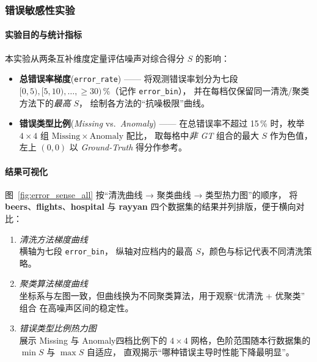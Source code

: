 \documentclass[10pt]{article} %
\numberwithin{equation}{section}
\begin{document}
\subsubsection{\textcolor[rgb]{0.00,0.07,1.00}{错误敏感性实验}}
\label{sec:error_sense_exp}

\paragraph{实验目的与统计指标}
本实验从两条互补维度定量评估噪声对综合得分 \(S\) 的影响：
\begin{itemize}[leftmargin=1.9em]
  \item \textbf{总错误率梯度}\;(\texttt{error\_rate}) ——  
        将观测错误率划分为七段
        \(\![0,5),[5,10),\dots,\ge{}30)\,\%\)（记作 \texttt{error\_bin}），
        并在每档仅保留同一清洗\;/\;聚类方法下的\emph{最高} \(S\)，
        绘制各方法的“抗噪极限”曲线。
  \item \textbf{错误类型比例}\;(\textit{Missing} vs.\ \textit{Anomaly}) ——  
        在总错误率不超过 15 \% 时，枚举
        \(4\times4\) 组 \(\mathrm{Missing}\times\mathrm{Anomaly}\) 配比，
        取每格中\emph{非 GT} 组合的最大 \(S\) 作为色值，
        左上 \((0,0)\) 以 \textit{Ground-Truth} 得分作参考。
\end{itemize}

\paragraph{结果可视化}
图~\ref{fig:error_sense_all} 按“清洗曲线 → 聚类曲线 → 类型热力图”的顺序，
将 \textbf{beers}、\textbf{flights}、\textbf{hospital} 与 \textbf{rayyan}
四个数据集的结果并列排版，便于横向对比：
\begin{enumerate}[label=\arabic*) ,leftmargin=1.2em]
  \item \emph{清洗方法梯度曲线} \\
        横轴为七段 \texttt{error\_bin}，
        纵轴对应档内的最高 \(S\)，颜色与标记代表不同清洗策略。
  \item \emph{聚类算法梯度曲线} \\
        坐标系与左图一致，但曲线换为不同聚类算法，用于观察“优清洗 + 优聚类” 组合
        在高噪声区间的稳定性。
  \item \emph{错误类型比例热力图} \\
        展示 Missing 与 Anomaly四档比例下的 \(4\times4\) 网格，色阶范围随本行数据集的 \(\min S\) 与 \(\max S\) 自适应，
        直观揭示“哪种错误主导时性能下降最明显”。
\end{enumerate}
\end{document}
